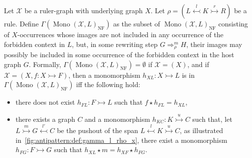 \begin{definition}
    \label{antipattern:def:gamma_l_rho_x}
    Let $\mathcal{X}$ be a ruler-graph with underlying graph $X$. 
    Let \( \rho = (L \overset{l}{\leftarrowtail} K \overset{r}{\rightarrowtail} R) \) be a rule.
    Define $\Gamma(\operatorname{Mono}(\mathcal{X},L)_{\operatorname{NF}})$ as the subset of $\operatorname{Mono}(\mathcal{X},L)_{\operatorname{NF}}$ consisting of $X$-occurrences whose images are not included in any occurrence of the forbidden context in $L$,
    but, in some rewriting step $G \Rightarrow_\rho^m H$, their images may possibly be included in some occurrence of the forbidden context in the host graph $G$.
    Formally,  $\Gamma(\operatorname{Mono}(\mathcal{X},L)_{\operatorname{NF}}) = \emptyset$ if $\mathcal{X} = (X)$, and if $\mathcal{X} = (X, f:X \rightarrowtail F)$, then a monomorphism $h_{XL}:X \rightarrowtail L$ is in $\Gamma(\operatorname{Mono}(\mathcal{X},L)_{\operatorname{NF}})$ iff the following hold:
    \begin{itemize}
        \item there does not exist $h_{FL}:F \rightarrowtail L$ such that $f \star h_{FL} = h_{XL}$,
         \item there exists a graph $C$ and a monomorphism $h_{KC}:K \overset{u}{\rightarrowtail} C$ such that, let $L \overset{m}{\rightarrowtail} G \overset{l'}{\leftarrowtail} C$ be the pushout of the span $L \overset{l}{\leftarrowtail} K \overset{u}{\rightarrowtail} C$, as illustrated in~\autoref{fig:antipattern:def:gamma_l_rho_x},
         there exist a monomorphism $h_{FG} : F \rightarrowtail G$ such that 
         $h_{XL} \star m = h_{XF} \star h_{FG}$. 
      \begin{figure}
        \centering
\end{figure}
\end{itemize}
\end{definition}

